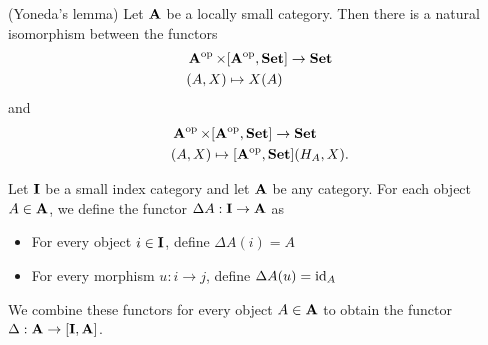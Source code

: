 \begin{theorem}(Yoneda's lemma)\label{def:yoneda_lemma}\cite[theorem 4.2.1]{Leinster2014}
  Let $\operatorname{\mathbf{A}}$ be a locally small category. Then there is a natural isomorphism between the functors
  \begin{align*}
    &\operatorname{\mathbf{A}}^{\operatorname{op}} \times [\operatorname{\mathbf{A}}^{\operatorname{op}}, \operatorname{\mathbf{Set}}] \to \operatorname{\mathbf{Set}} \\
    &(A, X) \mapsto X(A)
  \end{align*}
  and
  \begin{align*}
    &\operatorname{\mathbf{A}}^{\operatorname{op}} \times [\operatorname{\mathbf{A}}^{\operatorname{op}}, \operatorname{\mathbf{Set}}] \to \operatorname{\mathbf{Set}} \\
    &(A, X) \mapsto [\operatorname{\mathbf{A}}^{\operatorname{op}}, \operatorname{\mathbf{Set}}](H_A, X).
  \end{align*}
\end{theorem}

\begin{definition}\label{def:diagonal_functor}\cite[143]{Leinster2014}
  Let $\operatorname{\mathbf{I}}$ be a small index category and let $\operatorname{\mathbf{A}}$ be any category. For each object $A \in \operatorname{\mathbf{A}}$, we define the functor $\Delta A: \operatorname{\mathbf{I}} \to \operatorname{\mathbf{A}}$ as
  \begin{itemize}
    \item For every object $i \in \operatorname{\mathbf{I}}$, define $\Delta A(i) = A$
    \item For every morphism $u: i \to j$, define $\Delta A(u) = \operatorname{id}_A$
  \end{itemize}

  We combine these functors for every object $A \in \operatorname{\mathbf{A}}$ to obtain the functor $\Delta: \operatorname{\mathbf{A}} \to [\operatorname{\mathbf{I}}, \operatorname{\mathbf{A}}]$.
\end{definition}
